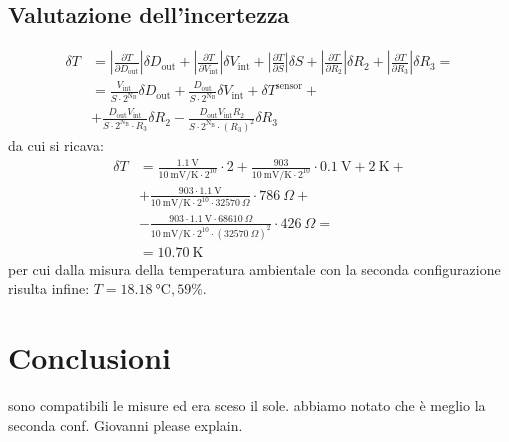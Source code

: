 \documentclass{article}
\begin{document}
\subsection{Valutazione dell'incertezza}
\begin{equation*}
    \begin{split}    
        \delta T&=\left|\frac{\partial T}{\partial D_{\text{out}}}\right|\delta D_{\text{out}}+\left|\frac{\partial T}{\partial V_{\text{int}}}\right|\delta V_{\text{int}}+\left|\frac{\partial T}{\partial S}\right|\delta S+\left|\frac{\partial T}{\partial R_2}\right|\delta R_2+\left|\frac{\partial T}{\partial R_3}\right|\delta R_3 =\\
        &=\frac{V_{\text{int}}}{S\cdot2^{\text{N}_\text{B}}}\delta D_{\text{out}}+\frac{D_{\text{out}}}{S\cdot2^{\text{N}_\text{B}}}\delta V_{\text{int}}+\delta T^{\text{sensor}}+\\
        &+\frac{D_{\text{out}}V_{\text{int}}}{S\cdot2^{\text{N}_\text{B}}\cdot R_3}\delta R_2-\frac{D_{\text{out}}V_{\text{int}}R_2}{S\cdot2^{\text{N}_\text{B}}\cdot {\left(R_3\right)}^2}\delta R_3
    \end{split}    
\end{equation*}
da cui si ricava:
\begin{equation*}
    \begin{split}
        \delta T&=\frac{\SI{1.1}\volt}{\SI{10}{\milli\volt\per\kelvin}\cdot2^{10}}\cdot 2+\frac{903}{\SI{10}{\milli\volt\per\kelvin}\cdot 2^{10}}\cdot\SI{0.1}{\volt}+\SI{2}{\kelvin}+\\
        &+\frac{903\cdot\SI{1.1}{\volt}}{\SI{10}{\milli\volt\per\kelvin}\cdot 2^{10}\cdot \SI{32570}{\Omega}}\cdot\SI{786}{\Omega}+\\
        &- \frac{903\cdot\SI{1.1}{\volt}\cdot\SI{68610}{\Omega}}{\SI{10}{\milli\volt\per\kelvin}\cdot 2^{10}\cdot{\left(\SI{32570}{\Omega}\right)}^2}\cdot\SI{426}{\Omega}=\\
        &=\SI{10.70}{\kelvin}
    \end{split}
\end{equation*}
per cui dalla misura della temperatura ambientale con la seconda configurazione risulta infine: $T = \SI{18.18}{\celsius}, 59\%$.
\section{Conclusioni}
sono compatibili le misure ed era sceso il sole. abbiamo notato che è meglio la seconda conf. Giovanni please explain.
\end{document}
